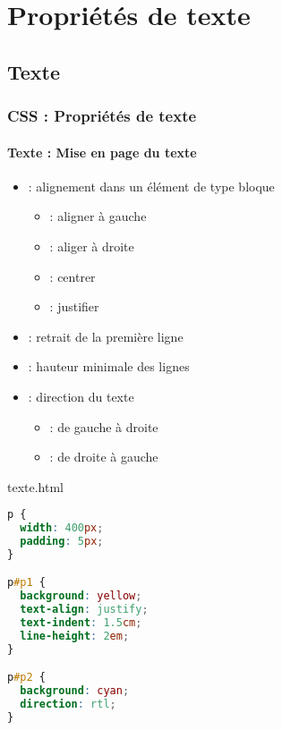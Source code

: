 \documentclass[xcolor=table]{beamer}
\begin{document}
\section{Propriétés de texte}

\subsection{Texte}

\begin{frame}[fragile]
\frametitle{CSS : Propriétés de texte}
\framesubtitle{Texte : Mise en page du texte}

\begin{minipage}{0.60\textwidth}
	\begin{itemize}
		\item {} : alignement dans un élément de type bloque
		\begin{itemize}
			\item {} : aligner à gauche
			\item {} : aliger à droite
			\item {} : centrer
			\item {} : justifier 
		\end{itemize}
		\item {} : retrait de la première ligne
		\item {} : hauteur minimale des lignes
		\item {} : direction du texte
		\begin{itemize}
			\item {} : de gauche à droite
			\item {} : de droite à gauche 
		\end{itemize}
	\end{itemize}
\end{minipage}
%
\begin{minipage}{0.38\textwidth}
	\begin{exampleblock}{texte.html}
		\lstset{escapeinside=**}
		\scriptsize\bfseries\vspace{-6pt}
\begin{lstlisting}[language={CSS}]
p {
  width: 400px; 
  padding: 5px;
}

p#p1 {
  background: yellow;
  text-align: justify;
  text-indent: 1.5cm;
  line-height: 2em;
}

p#p2 {
  background: cyan;
  direction: rtl;
}
\end{lstlisting}\vspace{-6pt}
	\end{exampleblock}
\end{minipage}
\end{frame}
\end{document}
